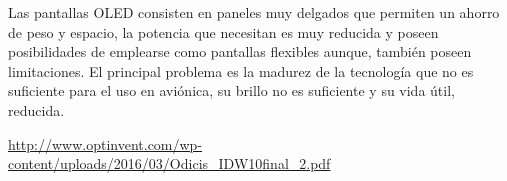 \begin{frame}
  
Las pantallas \ac{OLED} consisten en paneles muy delgados que permiten un ahorro
de peso y espacio, la potencia que necesitan es muy reducida y poseen posibilidades
de emplearse como pantallas flexibles aunque, tambi\'en poseen limitaciones.
El principal problema es la madurez de la tecnolog\'ia que no es suficiente
para el uso en avi\'onica, su brillo no es suficiente y su vida \'util, reducida.




\url{http://www.optinvent.com/wp-content/uploads/2016/03/Odicis_IDW10final_2.pdf}

\end{frame}